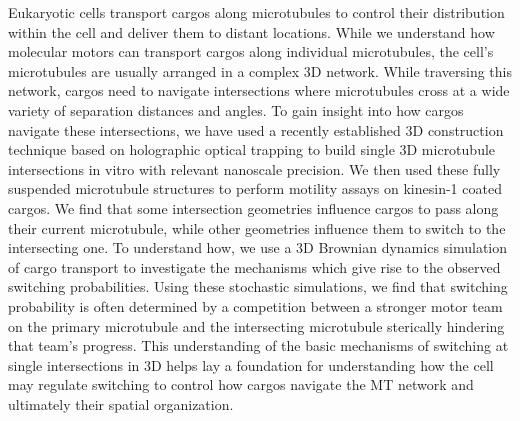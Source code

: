 \thesisabstract
{
Eukaryotic cells transport cargos along microtubules to control their distribution within the cell and deliver them to distant locations. While we understand how molecular motors can transport cargos along individual microtubules, the cell's microtubules are usually arranged in a complex 3D network. While traversing this network, cargos need to navigate intersections where microtubules cross at a wide variety of separation distances and angles. To gain insight into how cargos navigate these intersections, we have used a recently established 3D construction technique based on holographic optical trapping to build single 3D microtubule intersections in vitro with relevant nanoscale precision. We then used these fully suspended microtubule structures to perform motility assays on kinesin-1 coated cargos. We find that some intersection geometries influence cargos to pass along their current microtubule, while other geometries influence them to switch to the intersecting one. To understand how, we use a 3D Brownian dynamics simulation of cargo transport to investigate the mechanisms which give rise to the observed switching probabilities. Using these stochastic simulations, we find that switching probability is often determined by a competition between a stronger motor team on the primary microtubule and the intersecting microtubule sterically hindering that team's progress. This understanding of the basic mechanisms of switching at single intersections in 3D helps lay a foundation for understanding how the cell may regulate switching to control how cargos navigate the MT network and ultimately their spatial organization.
}


